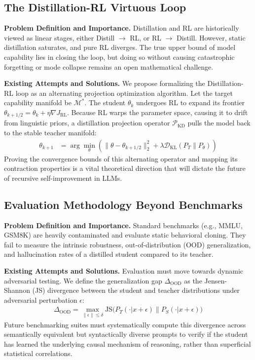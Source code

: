\documentclass{article} %
\begin{document}
\subsection{The Distillation-RL Virtuous Loop}
\textbf{Problem Definition and Importance.} Distillation and RL are historically viewed as linear stages, either Distill $\to$ RL, or RL $\to$ Distill. However, static distillation saturates, and pure RL diverges. The true upper bound of model capability lies in closing the loop, but doing so without causing catastrophic forgetting or mode collapse remains an open mathematical challenge.

\textbf{Existing Attempts and Solutions.} We propose formalizing the Distillation-RL loop as an alternating projection optimization algorithm. Let the target capability manifold be $\mathcal{M}^*$. The student $\theta_k$ undergoes RL to expand its frontier $\theta_{k+1/2} = \theta_k + \eta \nabla J_{\text{RL}}$. Because RL warps the parameter space, causing it to drift from linguistic priors, a distillation projection operator $\mathcal{P}_{\text{KD}}$ pulls the model back to the stable teacher manifold:
\begin{align}
\theta_{k+1} &= \arg\min_{\theta} \left( \parallel \theta - \theta_{k+1/2} \parallel_2^2 + \lambda \mathcal{D}_{\text{KL}}(P_T \parallel P_\theta) \right)
\end{align}
Proving the convergence bounds of this alternating operator and mapping its contraction properties is a vital theoretical direction that will dictate the future of recursive self-improvement in LLMs.

\subsection{Evaluation Methodology Beyond Benchmarks}
\textbf{Problem Definition and Importance.} Standard benchmarks (e.g., MMLU, GSM8K) are heavily contaminated and evaluate static behavioral cloning. They fail to measure the intrinsic robustness, out-of-distribution (OOD) generalization, and hallucination rates of a distilled student compared to its teacher.

\textbf{Existing Attempts and Solutions.} Evaluation must move towards dynamic adversarial testing. We define the generalization gap $\Delta_{\text{OOD}}$ as the Jensen-Shannon (JS) divergence between the student and teacher distributions under adversarial perturbation $\epsilon$:
\begin{align}
\Delta_{\text{OOD}} = \max_{\parallel \epsilon \parallel \le \delta} \text{JS}\Big( P_T(\cdot | x + \epsilon) \parallel P_S(\cdot | x + \epsilon) \Big)
\end{align}
Future benchmarking suites must systematically compute this divergence across semantically equivalent but syntactically diverse prompts to verify if the student has learned the underlying causal mechanism of reasoning, rather than superficial statistical correlations.
\end{document}
